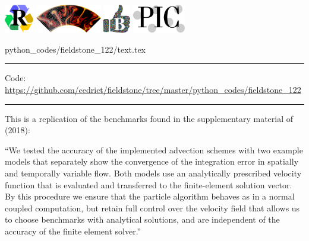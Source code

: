 \noindent
\includegraphics[height=1.25cm]{images/pictograms/replication}
\includegraphics[height=1.25cm]{images/pictograms/aspect_logo}
\includegraphics[height=1.25cm]{images/pictograms/benchmark}
\includegraphics[height=1.25cm]{images/pictograms/pic}


\begin{flushright} {\tiny {\color{gray} python\_codes/fieldstone\_122/text.tex}} \end{flushright}

%

\par\noindent\rule{\textwidth}{0.4pt}

\begin{center}
\inpython
{\small Code: \url{https://github.com/cedrict/fieldstone/tree/master/python_codes/fieldstone_122}}
\end{center}

\par\noindent\rule{\textwidth}{0.4pt}


This \stone is a replication of the benchmarks found in the supplementary material 
of \textcite{galh18} (2018): 

\begin{displayquote}
``We tested the accuracy of the implemented advection
schemes with two example models that separately show the
convergence of the integration error in spatially and temporally 
variable flow. Both models use an analytically prescribed 
velocity function that is evaluated and transferred
to the finite-element solution vector. By this procedure we
ensure that the particle algorithm behaves as in a normal
coupled computation, but retain full control over the velocity 
field that allows us to choose benchmarks with analytical
solutions, and are independent of the accuracy of the finite
element solver.''
\end{displayquote}

